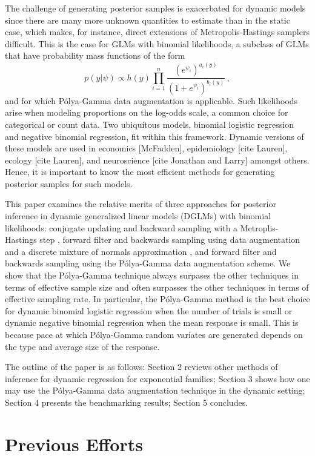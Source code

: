 \documentclass[11pt]{article}
\newcommand{\Polya}{P\'{o}lya}
\begin{document}
The challenge of generating posterior samples is exacerbated for dynamic models
since there are many more unknown quantities to estimate than in the static
case, which makes, for instance, direct extensions of Metropolis-Hastings
samplers difficult.  This is the case for GLMs with binomial likelihoods, a
subclass of GLMs that have probability mass functions of the form
\[
p(y | \psi) \propto h(y) \prod_{i=1}^n
\frac{(e^{\psi_i})^{a_i(y)}}{(1+e^{\psi_i})^{b_i(y)}} \, ,
\]
and for which \Polya-Gamma data augmentation is applicable.  Such likelihoods
arise when modeling proportions on the log-odds scale, a common choice for
categorical or count data.  Two ubiquitous models, binomial logistic regression and
negative binomial regression, fit within this framework.  Dynamic versions of
these models are used in economics [McFadden], epidemiology [cite Lauren],
ecology [cite Lauren], and neuroscience [cite Jonathan and Larry] amongst
others.  Hence, it is important to know the most efficient methods for
generating posterior samples for such models.

This paper examines the relative merits of three approaches for posterior
inference in dynamic generalized linear models (DGLMs) with binomial
likelihoods: conjugate updating and backward sampling with a Metroplis-Hastings
step \citep{ravines-etal-2006}, forward filter and backwards sampling using data
augmentation and a discrete mixture of normals approximation
\citep{fruhwirth-schnatter-etal-2009, fussl-etal-2013}, and forward filter and
backwards sampling using the \Polya-Gamma data augmentation scheme.  We show
that the \Polya-Gamma technique always surpases the other techniques in terms of
effective sample size and often surpasses the other techniques in terms of
effective sampling rate.  In particular, the \Polya-Gamma method is the best
choice for dynamic binomial logistic regression when the number of trials is
small or dynamic negative binomial regression when the mean response is small.
This is because pace at which \Polya-Gamma random variates are generated depends
on the type and average size of the response.

The outline of the paper is as follows: Section 2 reviews other methods of
inference for dynamic regression for exponential families; Section 3 shows how
one may use the \Polya-Gamma data augmentation technique in the dynamic setting;
Section 4 presents the benchmarking results; Section 5 concludes.

\section{Previous Efforts}
\end{document}
